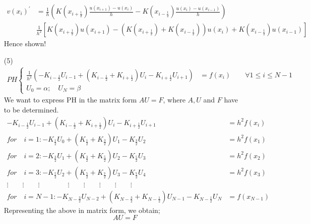 \documentclass[12pt,a4paper]{article}
\begin{document}
\begin{itemize}
	\begin{align*}
	v(x_{i})^{\prime}&=\frac{1}{h}\left(K\left(x_{i+\frac{1}{2}}\right)\frac{u\left(x_{i+1}\right)-u\left(x_{i}\right)}{h}-K\left(x_{i-\frac{1}{2}}\right)\frac{u\left(x_{i}\right)-u\left(x_{i-1}\right)}{h}\right)\\
	&\frac{1}{h^{2}}\left[K\left(x_{i+\frac{1}{2}}\right)u\left(x_{i+1}\right)-\left(K\left(x_{i+\frac{1}{2}}\right)+K\left(x_{i-\frac{1}{2}}\right)\right)u\left(x_{i}\right)+K\left(x_{i-\frac{1}{2}}\right)u\left(x_{i-1}\right)\right]
	\end{align*}
	Hence shown!
	
	\item[(5)] 
	\begin{align*}
	PH
	\begin{cases}
	\frac{1}{h^{2}}\left(-K_{i-\frac{1}{2}}U_{i-1}+\left(K_{i-\frac{1}{2}}+K_{i+\frac{1}{2}}\right)U_{i}-K_{i+\frac{1}{2}}U_{i+1}\right)&=f(x_{i}) \quad \quad \forall 1 \leq i\leq N-1\\
	U_{0}=\alpha; \quad U_{N}=\beta
	\end{cases}
	\end{align*}
	We want to express PH in the matrix form $AU=F$, where $A, U$ and $F$ have to be determined.
	\begin{align*}
	-K_{i-\frac{1}{2}}U_{i-1}+\left(K_{i-\frac{1}{2}}+K_{i+\frac{1}{2}}\right)U_{i}-K_{i+\frac{1}{2}}U_{i+1}&=h^{2}f(x_{i})\\
	for \quad i=1: -K_{\frac{1}{2}}U_{0} +\left(K_{\frac{1}{2}}+K_{\frac{3}{2}}\right)U_{1}-K_{\frac{3}{2}}U_{2} &=h^{2}f(x_{1})\\
	for \quad i=2: -K_{\frac{3}{2}}U_{1}+\left(K_{\frac{3}{2}}+K_{\frac{5}{2}}\right)U_{2}-K_{\frac{5}{2}}U_{3}&=h^{2}f(x_{2})\\
	for \quad i =3: -K_{\frac{5}{2}}U_{2}+\left(K_{\frac{5}{2}}+K_{\frac{7}{2}}\right)U_{3}-K_{\frac{7}{2}}U_{4}&=h^{2}f(x_{3})\\
	\vdots \qquad \vdots \qquad 	\vdots \qquad \qquad \vdots \qquad \vdots \qquad \vdots \qquad \vdots \qquad \vdots\\
	for \quad i=N-1:-K_{N-\frac{3}{2}}U_{N-2}+\left(K_{N-\frac{3}{2}}+K_{N-\frac{1}{2}}\right)U_{N-1}-K_{N-\frac{1}{2}}U_{N}&=f(x_{N-1})
	\end{align*}
	Representing the above in matrix form, we obtain;
	$$AU=F$$
	\begin{align*}

\end{align*}
\end{itemize}
\end{document}
